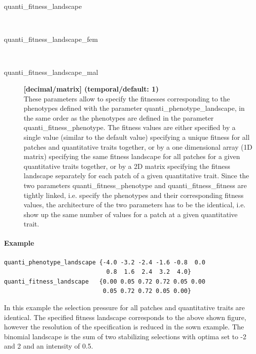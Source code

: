 \documentclass[letterpaper,12pt,oneside]{book}
\begin{document}
\begin{description}
\item[quanti\_fitness\_landscape]\hspace*{\fill}\\
\vspace{-9mm}
\item[quanti\_fitness\_landscape\_fem]\hspace*{\fill}\\
\vspace{-9mm}
\item[quanti\_fitness\_landscape\_mal]\textbf{[decimal/matrix] (temporal/default: 1)}\\
These parameters allow to specify the fitnesses corresponding to the phenotypes defined with the parameter \textsf{quanti\_phenotype\_landscape}, in the same order as the phenotypes are defined in the parameter \textsf{quanti\_fitness\_phenotype}. The fitness values are either specified by a single value (similar to the default value) specifying a unique fitness for all patches and quantitative traits together, or by a one dimensional array (1D matrix) specifying the same fitness landscape for all patches for a given quantitative traits together, or by a 2D matrix specifying the fitness landscape separately for each patch of a given quantitative trait. Since the two parameters \textsf{quanti\_fitness\_phenotype} and \textsf{quanti\_fitness\_fitness} are tightly linked, i.e. specify the phenotypes and their corresponding fitness values, the architecture of the two parameters has to be the identical, i.e. show up the same number of values for a patch at a given quantitative trait.  
\end{description}

\paragraph{Example}\hspace*{\fill}
\begin{lstlisting}[frame=single]
quanti_phenotype_landscape {-4.0 -3.2 -2.4 -1.6 -0.8  0.0  
                             0.8  1.6  2.4  3.2  4.0}
quanti_fitness_landscape   {0.00 0.05 0.72 0.72 0.05 0.00 
                            0.05 0.72 0.72 0.05 0.00}	
\end{lstlisting}
In this example the selection pressure for all patches and quantitative traits are identical. The specified fitness landscape corresponds to the above shown figure, however the resolution of the specification is reduced in the sown example. The binomial landscape is the sum of two stabilizing selections with optima set to -2 and 2 and an intensity of 0.5. 
\end{document}
